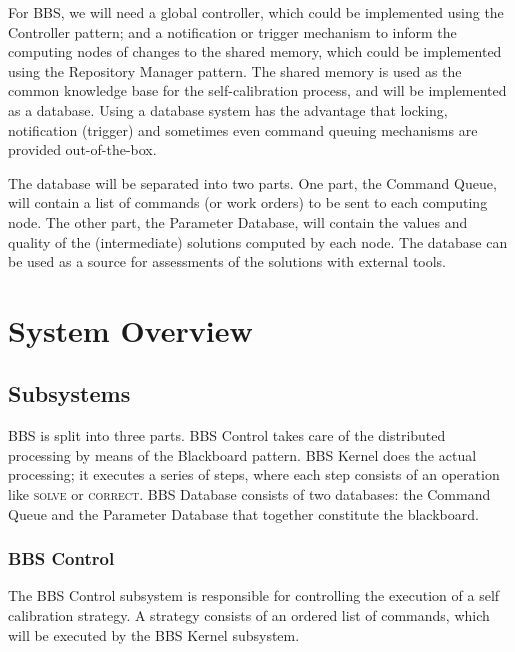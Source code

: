 \documentclass[10pt]{lofar}
\newcommand{\correct}{\textsc{correct}\xspace}
\newcommand{\solve}{\textsc{solve}\xspace}
\begin{document}
For BBS, we will need a global controller, which could be implemented using
the Controller pattern; and a notification or trigger mechanism to inform the
computing nodes of changes to the shared memory, which could be implemented
using the Repository Manager pattern. The shared memory is used as the common
knowledge base for the self-calibration process, and will be implemented as a
database. Using a database system has the advantage that locking, notification
(trigger) and sometimes even command queuing mechanisms are provided
out-of-the-box.

The database will be separated into two parts. One part, the Command Queue, will
contain a list of commands (or work orders) to be sent to each computing node.
The other part, the Parameter Database, will contain the values and quality of
the (intermediate) solutions computed by each node. The database can be used as
a source for assessments of the solutions with external tools.

\cleardoublepage

\section{System Overview}
\label{sec:overview}

\subsection{Subsystems}
\label{subsec:subsystems}
BBS is split into three parts. BBS Control takes care of the distributed
processing by means of the Blackboard pattern. BBS Kernel does the actual
processing; it executes a series of steps, where each step consists of an
operation like \solve or \correct. BBS Database consists of two databases: the
Command Queue and the Parameter Database that together constitute the
blackboard.

\subsubsection{BBS Control}
\label{subsubsec:sys-control}

The BBS Control subsystem is responsible for controlling the execution of a
self calibration strategy. A strategy consists of an ordered list of commands,
which will be executed by the BBS Kernel subsystem.
\end{document}

